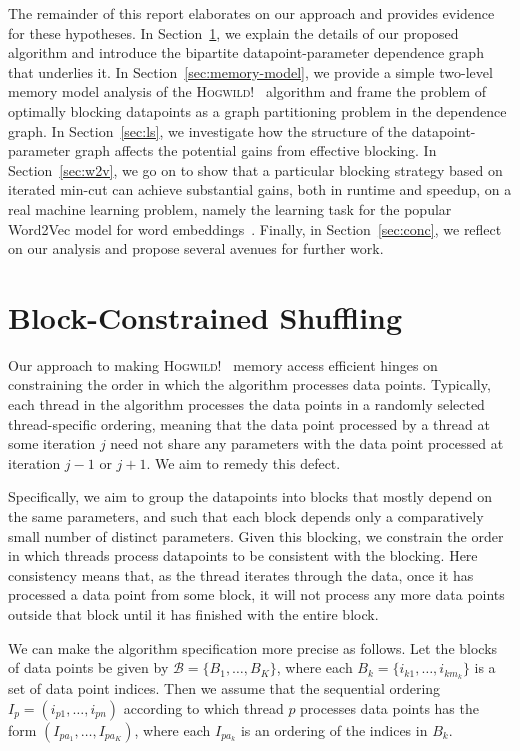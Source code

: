\documentclass[times,11pt]{article}
\numberwithin{equation}{section}		%
\numberwithin{figure}{section}			%
\numberwithin{table}{section}				%
\newcommand{\HW}{\textsc{Hogwild!}}
\newcommand{\blocks}{\mathcal{B}}
\begin{document}
The remainder of this report elaborates on our approach and provides evidence for these hypotheses. In Section~\ref{sec:alg-spec}, we explain the details of our proposed algorithm and introduce the bipartite datapoint-parameter dependence graph that underlies it. In Section~\ref{sec:memory-model}, we provide a simple 
two-level memory model analysis of the \HW~ algorithm and frame the problem of optimally blocking datapoints as a graph partitioning problem in the dependence graph. In Section~\ref{sec:ls}, we investigate how the structure of the datapoint-parameter graph affects the potential gains from 
effective blocking. In Section~\ref{sec:w2v}, we go on to show that a particular blocking strategy based on iterated min-cut can achieve substantial gains, both in runtime and speedup, on a real machine learning problem, namely the learning task for the popular Word2Vec model for word embeddings~\citep{}. Finally, in 
Section~\ref{sec:conc}, we reflect on our analysis and propose several avenues for further work.

\section{Block-Constrained Shuffling}\label{sec:alg-spec}

Our approach to making \HW~ memory access efficient hinges on constraining the order in which the algorithm processes data points. Typically, each thread
in the algorithm processes the data points in a randomly selected thread-specific ordering, meaning that the data
point processed by a thread at some iteration $j$ need not share any parameters with the data point processed at iteration $j - 1$ or $j + 1$. We aim to remedy this defect.

Specifically, we aim to group the datapoints into blocks that mostly depend on the same parameters, and such that each block depends only a comparatively small number of 
distinct parameters. Given this blocking, we constrain the order in which threads process datapoints to be consistent with the blocking. Here consistency means that, as the thread iterates through
the data, once it has processed a data point from some block, it will not process any more data points outside that block until it has finished with the entire block.

We can make the algorithm specification more precise as follows. Let the blocks of data points be given by $\blocks = \lbrace B_{1}, \dots, B_{K} \rbrace$, where each $B_{k} = \lbrace i_{k1}, \dots, i_{km_{k}}\rbrace$ is a set of data point indices. Then we assume that the sequential ordering
$I_{p} = \left(i_{p1}, \dots, i_{pn}\right)$ according to which thread $p$ processes data points has the form $\left(I_{pa_{1}}, \dots, I_{pa_{K}}\right)$, where each $I_{pa_{k}}$ is an ordering of the indices in $B_{k}$. 
\end{document}
